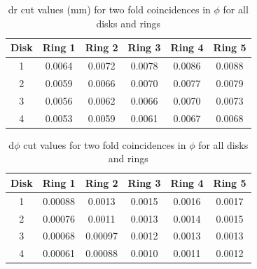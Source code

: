 \begin{table}[H]
  \centering
  \caption[dr cut values for two-fold in $\phi$]{dr cut values (mm) for two fold coincidences in $\phi$ for all disks and rings}
  \begin{tabular}{cccccc}
    \textbf{Disk} & \textbf{Ring 1} & \textbf{Ring 2} & \textbf{Ring 3} & \textbf{Ring 4} & \textbf{Ring 5} \\
    \hline
    1  & 0.0064 & 0.0072  & 0.0078 & 0.0086 & 0.0088 \\
    2  & 0.0059 & 0.0066 & 0.0070 & 0.0077 & 0.0079 \\
    3  & 0.0056 & 0.0062 & 0.0066 & 0.0070  & 0.0073 \\
    4  & 0.0053  & 0.0059 & 0.0061  & 0.0067 & 0.0068 \\
  \end{tabular}
  \label{tab:disk_values}
\end{table}

\begin{table}[H]
  \centering
  \caption[d$\phi$ cut values for two-fold in $\phi$]{d$\phi$ cut values for two fold coincidences in $\phi$ for all disks and rings}
  \begin{tabular}{cccccc}
    \textbf{Disk} & \textbf{Ring 1} & \textbf{Ring 2} & \textbf{Ring 3} & \textbf{Ring 4} & \textbf{Ring 5} \\
    \hline
    1  & 0.00088  & 0.0013   & 0.0015    & 0.0016   & 0.0017   \\
    2  & 0.00076   & 0.0011   & 0.0013   & 0.0014   & 0.0015   \\
    3  & 0.00068  & 0.00097  & 0.0012   & 0.0013   & 0.0013   \\
    4  & 0.00061  & 0.00088  & 0.0010   & 0.0011   & 0.0012   \\
  \end{tabular}
  \label{tab:mdphi_cuts_values}
\end{table}


